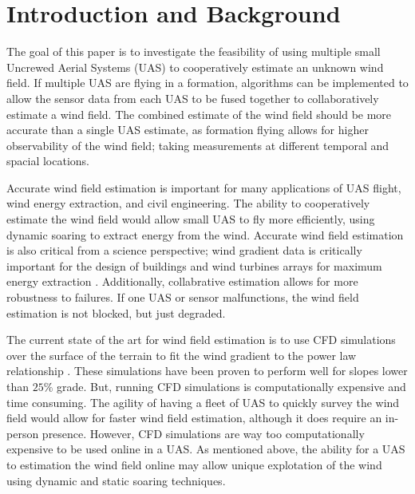 \section{Introduction and Background}




The goal of this paper is to investigate the feasibility of using multiple small Uncrewed Aerial Systems (UAS) to cooperatively estimate an unknown wind field. 
If multiple UAS are flying in a formation, algorithms can be implemented to allow the sensor data from each UAS to be fused together to collaboratively estimate a wind field.
The combined estimate of the wind field should be more accurate than a single UAS estimate, as formation flying allows for higher observability of the wind field; taking measurements at different temporal and spacial locations.

Accurate wind field estimation is important for many applications of UAS flight, wind energy extraction, and civil engineering. The ability to cooperatively estimate the wind field would allow small UAS to fly more efficiently, using dynamic soaring to extract energy from the wind.
Accurate wind field estimation is also critical from a science perspective; wind gradient data is critically important for the design of buildings and wind turbines arrays for maximum energy extraction \cite{abdalla2023, matiko2013, rehman2008, vasel2017}. 
Additionally, collabrative estimation allows for more robustness to failures. If one UAS or sensor malfunctions, the wind field estimation is not blocked, but just degraded. 

The current state of the art for wind field estimation is to use CFD simulations over the surface of the terrain to fit the wind gradient to the power law relationship \cite{probst2010}.
These simulations have been proven to perform well for slopes lower than $25\%$ grade. 
But, running CFD simulations is computationally expensive and time consuming. 
The agility of having a fleet of UAS to quickly survey the wind field would allow for faster wind field estimation, although it does require an in-person presence.
However, CFD simulations are way too computationally expensive to be used online in a UAS.
As mentioned above, the ability for a UAS to estimation the wind field online may allow unique explotation of the wind using dynamic and static soaring techniques.


